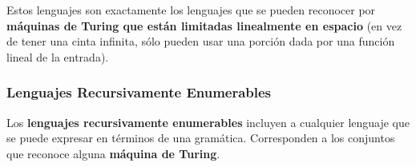 Estos lenguajes son exactamente los lenguajes que se pueden reconocer por \textbf{máquinas de Turing que están limitadas linealmente en espacio} (en vez de tener una cinta infinita, sólo pueden usar una porción dada por una función lineal de la entrada).

\subsubsection{Lenguajes Recursivamente Enumerables}

Los \textbf{lenguajes recursivamente enumerables} incluyen a cualquier lenguaje que se puede expresar en términos de una gramática. Corresponden a los conjuntos que reconoce alguna \textbf{máquina de Turing}.
